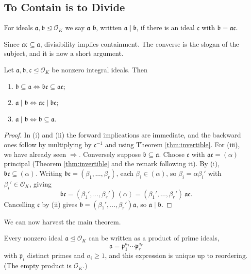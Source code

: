 \documentclass[a4paper]{scrartcl}
\renewcommand{\OO}{\mathcal{O}}
\newcommand{\fa}{\mathfrak{a}}
\newcommand{\fb}{\mathfrak{b}}
\newcommand{\fc}{\mathfrak{c}}
\newcommand{\fp}{\mathfrak{p}}
\begin{document}
\subsection{To Contain is to Divide}

\begin{definition}
	For ideals $\fa, \fb \trianglelefteq \OO_K$ we say $\fa$  $\fb$, written $\fa \mid \fb$, if there is an ideal $\fc$ with $\fb = \fa\fc$.
\end{definition}

Since $\fa\fc \subseteq \fa$, divisibility implies containment. The converse is the slogan of the subject, and it is now a short argument.

\begin{corollary}\label{cor:containdivide}
	Let $\fa,\fb,\fc \trianglelefteq \OO_K$ be nonzero integral ideals. Then
	\begin{enumerate}[label=(\roman*)]
		\item $\fb \subseteq \fa \iff \fb\fc \subseteq \fa\fc$;
		\item $\fa \mid \fb \iff \fa\fc \mid \fb\fc$;
		\item $\fa \mid \fb \iff \fb \subseteq \fa$.
	\end{enumerate}
\end{corollary}

\begin{proof}
	In (i) and (ii) the forward implications are immediate, and the backward ones follow by multiplying by $\fc^{-1}$ and using Theorem \ref{thm:invertible}. For (iii), we have already seen $\Rightarrow$. Conversely suppose $\fb \subseteq \fa$. Choose $\fc$ with $\fa\fc = (\alpha)$ principal (Theorem \ref{thm:invertible} and the remark following it). By (i), $\fb\fc \subseteq (\alpha)$. Writing $\fb\fc = (\beta_1, \dots, \beta_r)$, each $\beta_i \in (\alpha)$, so $\beta_i = \alpha\beta_i'$ with $\beta_i' \in \OO_K$, giving
	$$\fb\fc = (\beta_1',\dots,\beta_r')\,(\alpha) = (\beta_1',\dots,\beta_r')\,\fa\fc.$$
	Cancelling $\fc$ by (ii) gives $\fb = (\beta_1',\dots,\beta_r')\fa$, so $\fa \mid \fb$.
\end{proof}

We can now harvest the main theorem.

\begin{theorem}\label{thm:uniquefac}
	Every nonzero ideal $\fa \trianglelefteq \OO_K$ can be written as a product of prime ideals,
	$$\fa = \fp_1^{a_1}\cdots\fp_r^{a_r}$$
	with $\fp_i$ distinct primes and $a_i \geq 1$, and this expression is unique up to reordering. (The empty product is $\OO_K$.)
\end{theorem}
\end{document}
